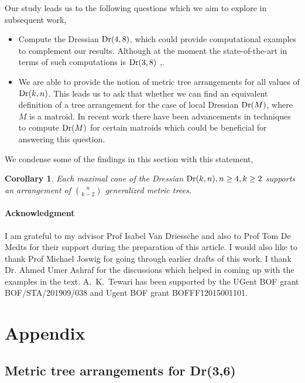 \documentclass[12pt]{article}
\DeclareMathOperator{\Dr}{\rm Dr}
\theoremstyle{plain}
\newtheorem{corollary}[theorem]{Corollary}
\theoremstyle{definition}
\numberwithin{subcase}{case}
\begin{document}
Our study leads us to the following questions which we aim to explore in subsequent work,

\begin{itemize}
    \item Compute the Dressian $\Dr(4,8)$, which could provide  computational examples to complement our results. Although at the moment the state-of-the-art in terms of such computations is $\Dr(3,8)$ \cite{herrmann2014dressians},\cite{bendle2020parallel}.
    \item We are able to provide the notion of metric tree arrangements for all values of $\Dr(k,n)$. This leads us to ask that whether we can find an equivalent definition of a tree arrangement for the case of local Dressian $\Dr(M)$, where $M$ is a matroid. In recent work \cite{BrandtSpeyer+2022+409+420} there have been advancements in techniques to compute $\Dr(M)$ for certain matroids which could be beneficial for answering this question.
\end{itemize}

We condense some of the findings in this section with this statement,

\begin{corollary}\label{cor:final}
Each maximal cone of the Dressian $\Dr(k,n), n \geq 4, k \geq 2$ supports an arrangement of $\binom{n}{k-2}$ generalized metric trees.
\end{corollary}

\paragraph{\bf Acknowledgment} I am grateful to my advisor Prof Isabel Van Driessche and also to Prof Tom De Medts for their support during the preparation of this article. I would also like to thank Prof Michael Joswig for going through earlier drafts of this work. I thank Dr. Ahmed Umer Ashraf for the discussions which helped in coming up with the examples in the text. A.~K.~Tewari has been supported by the UGent BOF grant BOF/STA/201909/038 and Ugent BOF grant BOFFF12015001101.



 


\appendix    


\section{Appendix} \label{app:appendix}
\subsection{Metric tree arrangements for Dr(3,6)}
\end{document}
